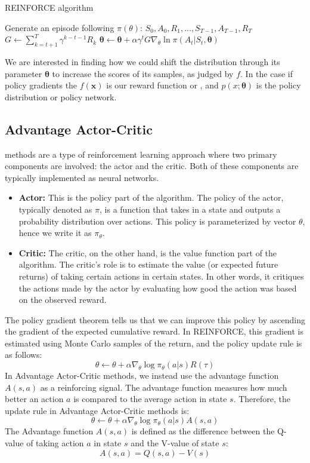 \begin{algorithm}
\caption{REINFORCE algorithm}
\begin{algorithmic}[1]
    \State Generate an episode following $\pi(\theta)$: $S_0, A_0, R_1, ..., S_{T-1}, A_{T-1}, R_T$
        \State $G \leftarrow \sum_{k=t+1}^T \gamma^{k-t-1} R_k$
        \State $ \boldsymbol{\theta} \leftarrow \boldsymbol{\theta} + \alpha \gamma^t G \nabla_\theta \ln \pi(A_t | S_t, \boldsymbol{\theta})$
    \EndFor
\EndFor
\EndProcedure
\end{algorithmic}
\end{algorithm}

We are interested in finding how we could shift the distribution through its parameter $\boldsymbol{\theta}$ to increase the scores of its samples, as judged by $f$. In the case if policy gradients the $f(\boldsymbol{x})$ is our reward function or , and $p(x;\boldsymbol{\theta})$ is the policy distribution or policy network.

\subsection{Advantage Actor-Critic}
 methods are a type of reinforcement learning approach where two primary components are involved: the actor and the critic. Both of these components are typically implemented as neural networks.
\begin{itemize}
    \item \textbf{Actor:} This is the policy part of the algorithm. The policy of the actor, typically denoted as $\pi$, is a function that takes in a state and outputs a probability distribution over actions. This policy is parameterized by vector $\theta$, hence we write it as $\pi_{\theta}$.
    \item \textbf{Critic:} The critic, on the other hand, is the value function part of the algorithm. The critic's role is to estimate the value (or expected future returns) of taking certain actions in certain states. In other words, it critiques the actions made by the actor by evaluating how good the action was based on the observed reward.
\end{itemize}
The policy gradient theorem tells us that we can improve this policy by ascending the gradient of the expected cumulative reward. In REINFORCE, this gradient is estimated using Monte Carlo samples of the return, and the policy update rule is as follows:
    \[\theta \leftarrow \theta + \alpha \nabla_{\theta} \log \pi_{\theta}(a|s) R(\tau)\]
In Advantage Actor-Critic methods, we instead use the advantage function $A(s, a)$ as a reinforcing signal. The advantage function measures how much better an action $a$ is compared to the average action in state $s$. Therefore, the update rule in Advantage Actor-Critic methods is:
\[\theta \leftarrow \theta + \alpha \nabla_{\theta} \log \pi_{\theta}(a|s) A(s, a)\]
The Advantage function $A(s,a)$ is defined as the difference between the Q-value of taking action $a$ in state $s$ and the V-value of state $s$:
$$A(s, a) = Q(s, a) - V(s)$$

